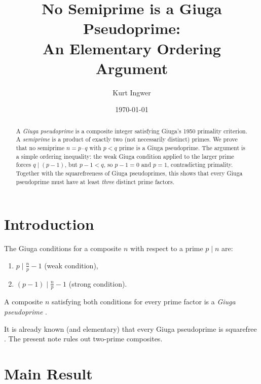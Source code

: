 \documentclass[12pt,a4paper]{amsart}
\theoremstyle{definition}
\begin{document}

\title{No Semiprime is a Giuga Pseudoprime:\\ An Elementary Ordering Argument}

\author{Kurt Ingwer}
\address{Specialist Mathematics Project, Version Build 44}
\date{\today}

\begin{abstract}
A \emph{Giuga pseudoprime} is a composite integer satisfying Giuga's 1950 primality
criterion.  A \emph{semiprime} is a product of exactly two (not necessarily distinct)
primes.  We prove that no semiprime $n = p \cdot q$ with $p < q$ prime is a Giuga
pseudoprime.  The argument is a simple ordering inequality: the weak Giuga condition
applied to the larger prime forces $q \mid (p-1)$, but $p - 1 < q$, so $p - 1 = 0$
and $p = 1$, contradicting primality.  Together with the squarefreeness of Giuga
pseudoprimes, this shows that every Giuga pseudoprime must have at least
\emph{three} distinct prime factors.
\end{abstract}

\maketitle

\section{Introduction}

The Giuga conditions for a composite $n$ with respect to a prime $p \mid n$ are:
\begin{enumerate}
  \item[\textup{(W)}] $p \mid \tfrac{n}{p} - 1$ \quad (weak condition),
  \item[\textup{(S)}] $(p-1) \mid \tfrac{n}{p} - 1$ \quad (strong condition).
\end{enumerate}
A composite $n$ satisfying both conditions for every prime factor is a
\emph{Giuga pseudoprime} \cite{Borwein1996}.

It is already known (and elementary) that every Giuga pseudoprime is squarefree
\cite{Ingwer2026sqfree}.  The present note rules out two-prime composites.

\section{Main Result}
\end{document}
